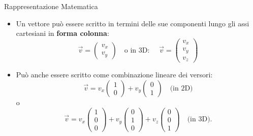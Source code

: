 \documentclass{beamer}
\begin{document}
\begin{frame}{Rappresentazione Matematica}
    \begin{itemize}
        \item Un vettore può essere scritto in termini delle sue componenti lungo gli assi cartesiani in \textbf{forma colonna}:
        \[
        \vec{v} =
        \begin{pmatrix}
            v_x \\
            v_y
        \end{pmatrix}
        \quad \text{o in 3D: } \quad
        \vec{v} =
        \begin{pmatrix}
            v_x \\
            v_y \\
            v_z
        \end{pmatrix}
        \]
        \item Può anche essere scritto come combinazione lineare dei versori:
        \[
        \vec{v} = v_x
        \begin{pmatrix}
            1 \\
            0
        \end{pmatrix}
        + v_y
        \begin{pmatrix}
            0 \\
            1
        \end{pmatrix}
        \quad \text{(in 2D)}
        \]
        o
        \[
        \vec{v} = v_x
        \begin{pmatrix}
            1 \\
            0 \\
            0
        \end{pmatrix}
        + v_y
        \begin{pmatrix}
            0 \\
            1 \\
            0
        \end{pmatrix}
        + v_z
        \begin{pmatrix}
            0 \\
            0 \\
            1
        \end{pmatrix}
        \quad \text{(in 3D)}.
        \]
    \end{itemize}
\end{frame}
\end{document}
